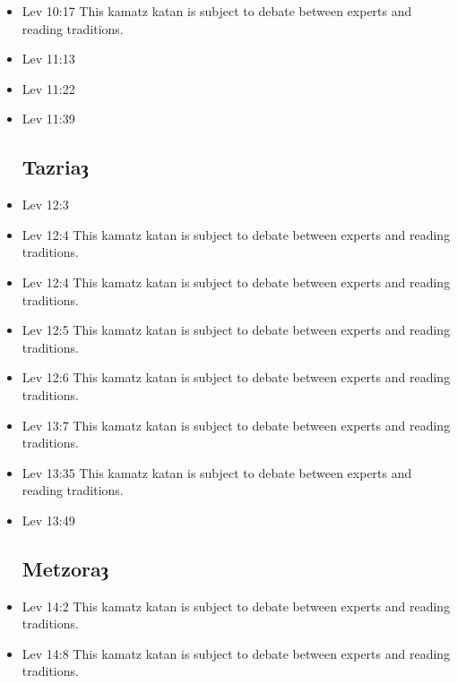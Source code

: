 \documentclass[14pt]{book}
\begin{document}
\begin{multicols}{2}
\begin{itemize}
\item Lev 10:17 This kamatz katan is subject to debate between experts and reading traditions.

\item Lev 11:13

\item Lev 11:22

\item Lev 11:39

\subsection{Tazriaȝ}

\item Lev 12:3

\item Lev 12:4 This kamatz katan is subject to debate between experts and reading traditions.

\item Lev 12:4 This kamatz katan is subject to debate between experts and reading traditions.

\item Lev 12:5 This kamatz katan is subject to debate between experts and reading traditions.

\item Lev 12:6 This kamatz katan is subject to debate between experts and reading traditions.

\item Lev 13:7 This kamatz katan is subject to debate between experts and reading traditions.

\item Lev 13:35 This kamatz katan is subject to debate between experts and reading traditions.

\item Lev 13:49

\subsection{Metzoraȝ}

\item Lev 14:2 This kamatz katan is subject to debate between experts and reading traditions.

\item Lev 14:8 This kamatz katan is subject to debate between experts and reading traditions.


\end{itemize}
\end{multicols}
\end{document}
